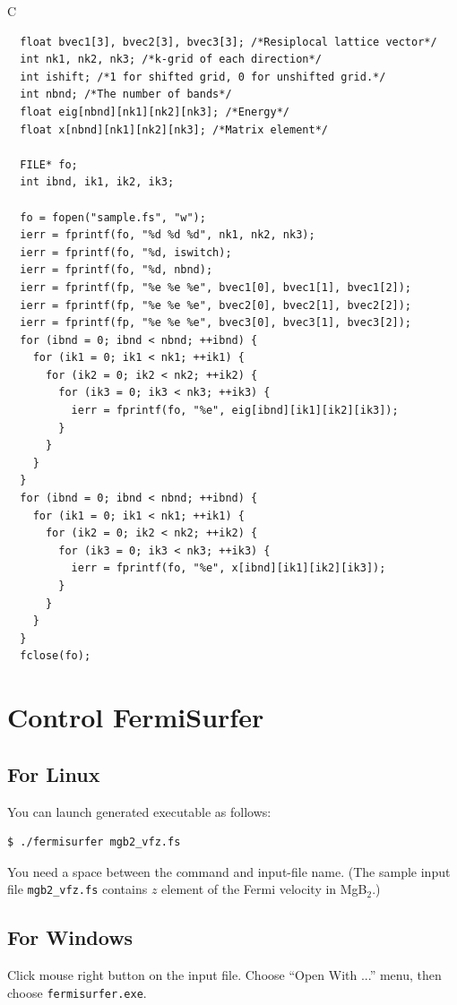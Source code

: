\documentclass[12pt]{article}
\begin{document}
C

\begin{verbatim}
  float bvec1[3], bvec2[3], bvec3[3]; /*Resiplocal lattice vector*/
  int nk1, nk2, nk3; /*k-grid of each direction*/
  int ishift; /*1 for shifted grid, 0 for unshifted grid.*/
  int nbnd; /*The number of bands*/
  float eig[nbnd][nk1][nk2][nk3]; /*Energy*/
  float x[nbnd][nk1][nk2][nk3]; /*Matrix element*/

  FILE* fo;
  int ibnd, ik1, ik2, ik3;

  fo = fopen("sample.fs", "w");
  ierr = fprintf(fo, "%d %d %d", nk1, nk2, nk3);
  ierr = fprintf(fo, "%d, iswitch);
  ierr = fprintf(fo, "%d, nbnd);
  ierr = fprintf(fp, "%e %e %e", bvec1[0], bvec1[1], bvec1[2]); 
  ierr = fprintf(fp, "%e %e %e", bvec2[0], bvec2[1], bvec2[2]);
  ierr = fprintf(fp, "%e %e %e", bvec3[0], bvec3[1], bvec3[2]);
  for (ibnd = 0; ibnd < nbnd; ++ibnd) {  
    for (ik1 = 0; ik1 < nk1; ++ik1) { 
      for (ik2 = 0; ik2 < nk2; ++ik2) { 
        for (ik3 = 0; ik3 < nk3; ++ik3) { 
          ierr = fprintf(fo, "%e", eig[ibnd][ik1][ik2][ik3]); 
        } 
      } 
    } 
  } 
  for (ibnd = 0; ibnd < nbnd; ++ibnd) {  
    for (ik1 = 0; ik1 < nk1; ++ik1) { 
      for (ik2 = 0; ik2 < nk2; ++ik2) { 
        for (ik3 = 0; ik3 < nk3; ++ik3) { 
          ierr = fprintf(fo, "%e", x[ibnd][ik1][ik2][ik3]); 
        } 
      } 
    } 
  } 
  fclose(fo); 
\end{verbatim}

\section{Control FermiSurfer}

\subsection{For Linux}
You can launch generated executable as follows:
\begin{verbatim}
$ ./fermisurfer mgb2_vfz.fs
\end{verbatim}
You need a space between the command and input-file name.
(The sample input file \verb|mgb2_vfz.fs| contains
$z$ element of the Fermi velocity in MgB$_2$.)

\subsection{For Windows}
Click mouse right button on the input file.
Choose ``Open With ...'' menu,
then choose \verb|fermisurfer.exe|.
\end{document}
